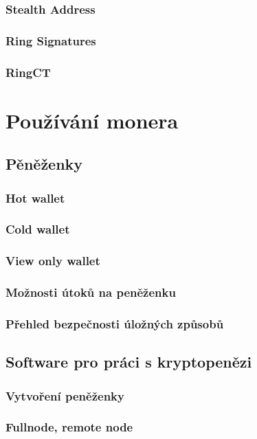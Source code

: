 \documentclass[
  printed, %
  table,   %
  nolof,     %
  nolot,     %
           oneside, color
]{fithesis3}
\begin{document}
\subsection{Stealth Address}
\label{sec:stealthaddresses} 
\subsection{Ring Signatures}
\label{sec:ringsignatures}
\subsection{RingCT}
\label{sec:ringct}
\chapter{Používání monera}
\section{Pěněženky}
\subsection{Hot wallet}
\subsection{Cold wallet}
\subsection{View only wallet}
\subsection{Možnosti útoků na peněženku}
\subsection{Přehled bezpečnosti úložných způsobů}
\section{Software pro práci s kryptopenězi}
\subsection{Vytvoření peněženky}
\subsection{Fullnode, remote node}
\end{document}

